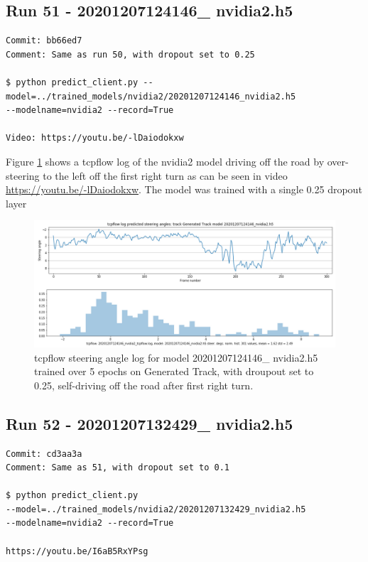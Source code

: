 \subsection{Run 51 - 20201207124146\_ nvidia2.h5 }
\label{app_res:51}
\begin{verbatim}
Commit: bb66ed7
Comment: Same as run 50, with dropout set to 0.25

$ python predict_client.py --model=../trained_models/nvidia2/20201207124146_nvidia2.h5
--modelname=nvidia2 --record=True

Video: https://youtu.be/-lDaiodokxw

\end{verbatim}

Figure \ref{fig:20201207124146_nvidia2_tcpflow} shows a tcpflow log of the nvidia2 model driving off the road by over-steering to the left off the first right turn as can be seen in video \url{https://youtu.be/-lDaiodokxw}. The model was trained with a single 0.25 dropout layer

\begin{figure}[ht]
 \centering 
 \includegraphics[width=\textwidth]{Figures/20201207124146_nvidia2_tcpflow.png}
 \caption{tcpflow steering angle log for model 20201207124146\_ nvidia2.h5 trained over 5 epochs on Generated Track, with droupout set to 0.25, self-driving off the road after first right turn.}
 \label{fig:20201207124146_nvidia2_tcpflow}
\end{figure}


\subsection{Run 52 - 20201207132429\_ nvidia2.h5}
\label{app_res:52}
\begin{verbatim}
Commit: cd3aa3a
Comment: Same as 51, with dropout set to 0.1

$ python predict_client.py 
--model=../trained_models/nvidia2/20201207132429_nvidia2.h5 
--modelname=nvidia2 --record=True

https://youtu.be/I6aB5RxYPsg

\end{verbatim}

